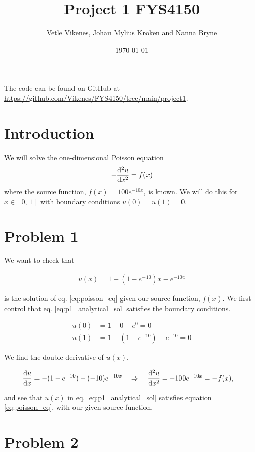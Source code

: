 \documentclass[english,notitlepage,nofootinbib]{revtex4-1}  %
\begin{document}
\title{Project 1 FYS4150} 
\author{Vetle Vikenes, Johan Mylius Kroken and Nanna Bryne}      
\date{\today}                 
\noaffiliation       

\maketitle 
The code can be found on GitHub at \url{https://github.com/Vikenes/FYS4150/tree/main/project1}.
    
\section*{Introduction}
We will solve the one-dimensional Poisson equation 
\begin{align} \label{eq:poisson_eq}
    - \dv[2]{u}{x}=f(x)
\end{align}
where the source function, $f(x)=100e^{-10x}$, is known. We will do this for $x\in[0,\,1]$ with boundary conditions $u(0)=u(1)=0$.

\section*{Problem 1}

We want to check that 

\begin{align}\label{eq:p1_analytical_sol}
    u(x) = 1 - (1-e^{-10})x - e^{-10x}
\end{align}

is the solution of eq. \eqref{eq:poisson_eq} given our source function, $f(x)$. We first control that eq. \eqref{eq:p1_analytical_sol} satisfies the boundary conditions. 

\begin{align*}
    u(0) &= 1 - 0 - e^{0} = 0 \\
    u(1) &= 1 - (1-e^{-10}) - e^{-10} = 0
\end{align*}
 
We find the double derivative of $u(x)$,

\begin{align*}
    \dv{u}{x} &= -(1-e^{-10}) - (-10)e^{-10x} \quad \Rightarrow \quad \dv[2]{u}{x} = -100e^{-10x}=-f(x),
\end{align*}

and see that $u(x)$ in eq. \eqref{eq:p1_analytical_sol} satisfies equation \eqref{eq:poisson_eq}, with our given source function.


\section*{Problem 2}
\end{document}
